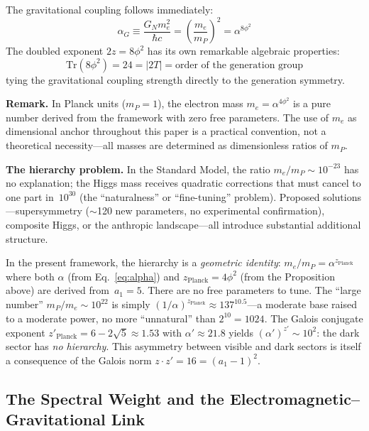 \documentclass[12pt,a4paper]{article}
\theoremstyle{definition}
\begin{document}
The gravitational coupling follows immediately:
\begin{equation}
\alpha_G \equiv \frac{G_N m_e^2}{\hbar c} = \left(\frac{m_e}{m_P}\right)^2 = \alpha^{8\phi^2}
\end{equation}
The doubled exponent $2z = 8\phi^2$ has its own remarkable algebraic properties:
\begin{equation}
\text{Tr}(8\phi^2) = 24 = |2T| = \text{order of the generation group}
\end{equation}
tying the gravitational coupling strength directly to the generation symmetry.

\textbf{Remark.}  In Planck units ($m_P = 1$), the electron mass $m_e = \alpha^{4\phi^2}$ is a pure number derived from the framework with zero free parameters.  The use of $m_e$ as dimensional anchor throughout this paper is a practical convention, not a theoretical necessity---all masses are determined as dimensionless ratios of $m_P$.

\textbf{The hierarchy problem.}  In the Standard Model, the ratio $m_e/m_P \sim 10^{-23}$ has no explanation; the Higgs mass receives quadratic corrections that must cancel to one part in~$10^{30}$ (the ``naturalness'' or ``fine-tuning'' problem).  Proposed solutions---supersymmetry ($\sim$120 new parameters, no experimental confirmation), composite Higgs, or the anthropic landscape---all introduce substantial additional structure.

In the present framework, the hierarchy is a \emph{geometric identity}: $m_e/m_P = \alpha^{z_{\text{Planck}}}$ where both $\alpha$ (from Eq.~\ref{eq:alpha}) and $z_{\text{Planck}} = 4\phi^2$ (from the Proposition above) are derived from~$a_1 = 5$.  There are no free parameters to tune.  The ``large number'' $m_P/m_e \sim 10^{22}$ is simply $(1/\alpha)^{z_{\text{Planck}}} \approx 137^{10.5}$---a moderate base raised to a moderate power, no more ``unnatural'' than $2^{10} = 1024$.  The Galois conjugate exponent $z'_{\text{Planck}} = 6 - 2\sqrt{5} \approx 1.53$ with $\alpha' \approx 21.8$ yields $(\alpha')^{z'} \sim 10^2$: the dark sector has \emph{no hierarchy}.  This asymmetry between visible and dark sectors is itself a consequence of the Galois norm $z \cdot z' = 16 = (a_1 - 1)^2$.

\subsection{The Spectral Weight and the Electromagnetic--Gravitational Link}
\label{sec:spectral_weight}
\end{document}
